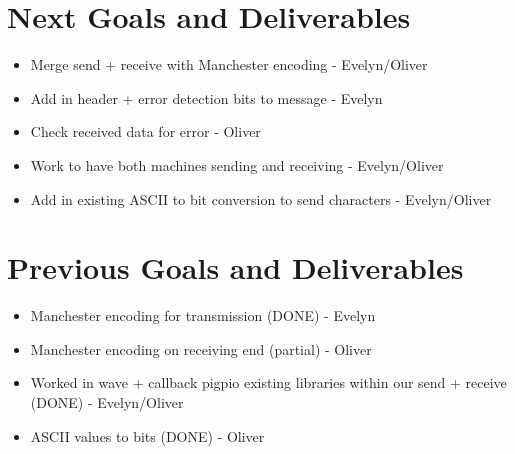 \documentclass{article}
\begin{document}
\section*{Next Goals and Deliverables}
\begin{itemize}
\item Merge send + receive with Manchester encoding - Evelyn/Oliver
\item Add in header + error detection bits to message - Evelyn
\item Check received data for error - Oliver
\item Work to have both machines sending and receiving - Evelyn/Oliver
\item Add in existing ASCII to bit conversion to send characters - Evelyn/Oliver
\end{itemize}
\section*{Previous Goals and Deliverables}
\begin{itemize}
\item Manchester encoding for transmission (DONE) - Evelyn
\item Manchester encoding on receiving end (partial) - Oliver
\item Worked in wave + callback pigpio existing libraries within our send + receive (DONE) - Evelyn/Oliver
\item ASCII values to bits (DONE) - Oliver
\end{itemize}
\end{document}
